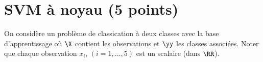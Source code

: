 \documentclass[11pt]{article}
\begin{document}
\section{SVM à noyau (5 points)}

On considère un problème de classication à deux classes avec la base d'apprentissage
où $\X$ contient les observations et $\yy$ les classes associées. Noter que chaque observation $x_i$, $(i=1,\ldots,5)$ est un scalaire (dans $\RR$).
\end{document}
